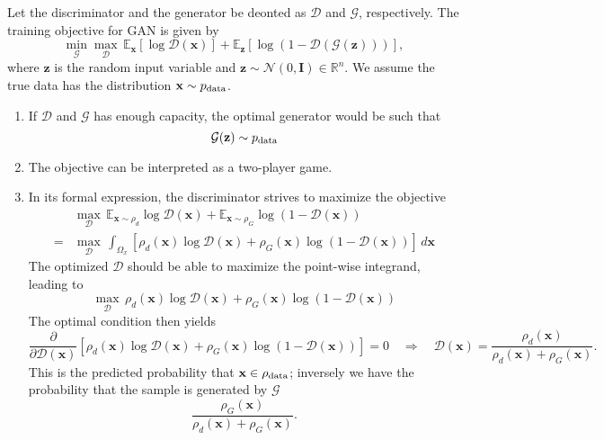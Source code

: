 \documentclass[a4paper, 10pt]{article}
\begin{document}
Let the discriminator and the generator be deonted as $\mathcal{D}$ and $\mathcal{G}$, respectively. The training objective for GAN is given by
\begin{equation}
    \min_{\mathcal{G}} \max_{\mathcal{D}} \, \mathbb{E}_{\mathbf{x}}[\log \mathcal{D}(\mathbf{x})] + \mathbb{E}_{\mathbf{z}}\left[\log\left(1 - \mathcal{D}(\mathcal{G}(\mathbf{z}))\right)\right],
\end{equation}
where $\mathbf{z}$ is the random input variable and $\mathbf{z} \sim \mathcal{N}(0, \mathbf{I}) \in \mathbb{R}^n$. We assume the true data has the distribution $\mathbf{x} \sim p_{\rm data}$.
\begin{enumerate}[label=(\alph*)]
    \item If $\mathcal{D}$ and $\mathcal{G}$ has enough capacity, the optimal generator would be such that
    \begin{equation}
        \mathcal{G}(\mathbf{z}) \sim p_{\rm data}
    \end{equation}
    \item The objective can be interpreted as a two-player game.
    \item In its formal expression, the discriminator strives to maximize the objective
    \begin{equation}
        \begin{aligned}
            &\max_\mathcal{D} \, \mathbb{E}_{\mathbf{x} \sim \rho_d} \log \mathcal{D}(\mathbf{x}) + \mathbb{E}_{\mathbf{x} \sim \rho_G} \log \left(1 - \mathcal{D}(\mathbf{x})\right) \\
            = &\max_\mathcal{D} \, \int_{\Omega_x} \left[\rho_d(\mathbf{x}) \log \mathcal{D}(\mathbf{x}) + \rho_G(\mathbf{x}) \log \left(1 - \mathcal{D}(\mathbf{x})\right)\right] \, d\mathbf{x}
        \end{aligned}
    \end{equation}
    The optimized $\mathcal{D}$ should be able to maximize the point-wise integrand, leading to
    \begin{equation}
        \max_{\mathcal{D}} \, \rho_d(\mathbf{x}) \log \mathcal{D}(\mathbf{x}) + \rho_G(\mathbf{x}) \log \left(1 - \mathcal{D}(\mathbf{x})\right)
    \end{equation}
    The optimal condition then yields 
    \begin{equation}
        \frac{\partial}{\partial \mathcal{D}(\mathbf{x})} \left[\rho_d(\mathbf{x}) \log \mathcal{D}(\mathbf{x}) + \rho_G(\mathbf{x}) \log \left(1 - \mathcal{D}(\mathbf{x})\right)\right] = 0 \quad \Longrightarrow \quad \mathcal{D}(\mathbf{x}) = \frac{\rho_d(\mathbf{x})}{\rho_d(\mathbf{x}) + \rho_G(\mathbf{x})}.
    \end{equation}
    This is the predicted probability that $\mathbf{x} \in \rho_{\rm data}$; inversely we have the probability that the sample is generated by $\mathcal{G}$
    \begin{equation}
        \frac{\rho_G(\mathbf{x})}{\rho_d(\mathbf{x}) + \rho_G(\mathbf{x})}.
    \end{equation}
\end{enumerate}
\end{document}
